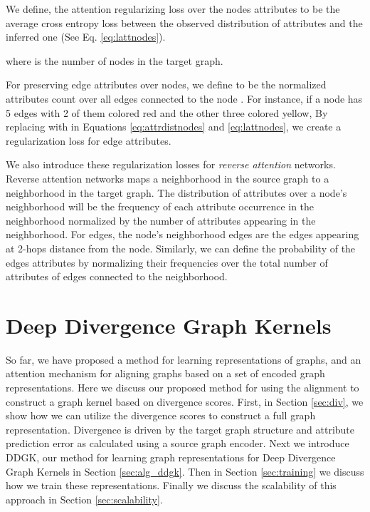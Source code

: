 \documentclass[sigconf]{acmart}
\begin{document}
\noindent We define, the attention regularizing loss over the nodes attributes to be the average cross entropy loss between the observed distribution of attributes and the inferred one (See Eq. \ref{eq:lattnodes}).

where  is the number of nodes in the target graph.

For preserving edge attributes over nodes, we define  to be the normalized attributes count over all edges connected to the node .
For instance, if a node  has 5 edges with 2 of them colored red and the other three colored yellow, 
By replacing  with  in Equations \ref{eq:attrdistnodes} and \ref{eq:lattnodes}, we create a regularization loss for edge attributes.

We also introduce these regularization losses for \emph{reverse attention} networks.
Reverse attention networks maps a neighborhood in the source graph to a neighborhood in the target graph.
The distribution of attributes over a node's neighborhood will be the frequency of each attribute occurrence in the neighborhood normalized by the number of attributes appearing in the neighborhood.
For edges, the node's neighborhood edges are the edges appearing at 2-hops distance from the node.
Similarly, we can define the probability of the edges attributes by normalizing their frequencies over the total number of attributes of edges connected to the neighborhood.


\section{Deep Divergence Graph Kernels}
\label{sec:graph_kernels}

So far, we have proposed a method for learning representations of graphs, and an attention mechanism for aligning graphs based on a set of encoded graph representations. 
Here we discuss our proposed method for using the alignment to construct a graph kernel based on divergence scores.
First, in Section \ref{sec:div}, we show how we can utilize the divergence scores to construct a full graph representation.
Divergence is driven by the target graph structure and attribute prediction error as calculated using a source graph encoder.
Next  we introduce DDGK, our method for learning graph representations for Deep Divergence Graph Kernels in Section \ref{sec:alg_ddgk}.
Then in Section \ref{sec:training} we discuss how we train these representations.
Finally we discuss the scalability of this approach in Section \ref{sec:scalability}.
\end{document}
